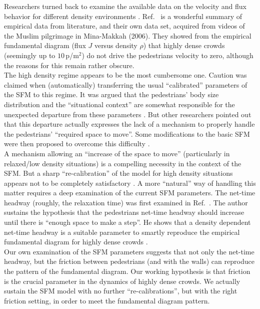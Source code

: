 Researchers turned back to examine the available data on the velocity and flux 
behavior for different density environments \cite{helbing3,seyfried,seyfried1}. 
Ref.~\cite{helbing3} is a wonderful summary of empirical data from literature, 
and their own data set, acquired from videos of the Muslim pilgrimage in 
Mina-Makkah (2006). They showed from the empirical fundamental diagram (flux $J$ 
versus density $\rho$) that highly dense crowds (seemingly up to $10\,$p/m$^2$) 
do not drive the pedestrians velocity to zero, although the reasons for this 
remain rather obscure.   \\


The high density regime appears to be the most cumbersome one. Caution was 
claimed when (automatically) transferring the usual ``calibrated'' parameters 
of the SFM to this regime. It was argued that the pedestrians' body size 
distribution and the ``situational context'' are somewhat responsible for the 
unexpected departure from these parameters \cite{johansson1,kwak}. But other 
researchers pointed out that this departure actually expresses the lack of a 
mechanism to properly handle the pedestrians' ``required space to move''. Some 
modifications to the basic SFM were then proposed to overcome this difficulty 
\cite{parisi2,seyfried2}. \\

A mechanism allowing an ``increase of the space to move'' (particularly in relaxed/low
 density situations) is a compelling necessity in the context of the SFM.
But a sharp ``re-calibration'' of the model for high density situations appears not 
to be completely satisfactory \cite{johansson}. A more ``natural'' way of 
handling this matter requires a deep examination of the current SFM parameters. 
The net-time headway (roughly, the relaxation time) was first examined in 
Ref.~\cite{johansson}. The author sustains the hypothesis that the 
pedestrians net-time headway should increase until there is ``enough space to 
make a step''.  He shows that a density dependent net-time headway is a 
suitable parameter to smartly reproduce the empirical fundamental diagram for 
highly dense crowds \cite{johansson}.  \\ 

Our own examination of the SFM parameters suggests that not only the net-time 
headway, but the friction between pedestrians (and with the walls) can 
reproduce the pattern of the fundamental diagram. Our working hypothesis is 
that friction is the crucial parameter in the dynamics of highly dense crowds. 
We actually sustain the SFM model with no further ``re-calibrations'', but 
with the right friction setting, in order to meet the fundamental diagram 
pattern. \\  

